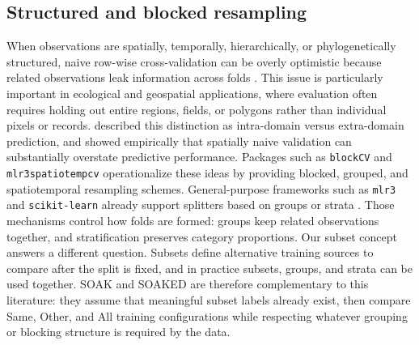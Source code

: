 \documentclass{article}
\begin{document}
\subsection{Structured and blocked resampling}
When observations are spatially, temporally, hierarchically, or phylogenetically structured, naive row-wise cross-validation can be overly optimistic because related observations leak information across folds \citep{roberts2017}.
This issue is particularly important in ecological and geospatial applications, where evaluation often requires holding out entire regions, fields, or polygons rather than individual pixels or records.
\citet{brenning2005} described this distinction as intra-domain versus extra-domain prediction, and \citet{ploton2020spatial} showed empirically that spatially naive validation can substantially overstate predictive performance.
Packages such as \texttt{blockCV} \citep{valavi2019} and \texttt{mlr3spatiotempcv} \citep{schratz2024} operationalize these ideas by providing blocked, grouped, and spatiotemporal resampling schemes.
General-purpose frameworks such as \texttt{mlr3} and \texttt{scikit-learn} already support splitters based on groups or strata \citep{Bischl2024,scikit-learn}. Those mechanisms control how folds are formed: groups keep related observations together, and stratification preserves category proportions. Our subset concept answers a different question. Subsets define alternative training sources to compare after the split is fixed, and in practice subsets, groups, and strata can be used together.
SOAK and SOAKED are therefore complementary to this literature: they assume that meaningful subset labels already exist, then compare Same, Other, and All training configurations while respecting whatever grouping or blocking structure is required by the data.
\end{document}
